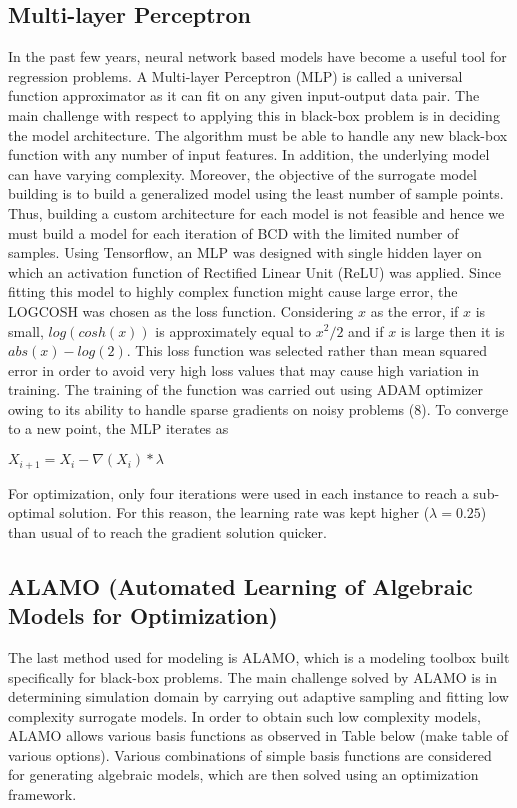 \subsection{Multi-layer Perceptron}
In the past few years, neural network based models have become a useful tool for regression problems. A Multi-layer Perceptron (MLP) is called a universal function approximator as it can fit on any given input-output data pair. The main challenge with respect to applying this in black-box problem is in deciding the model architecture. The algorithm must be able to handle any new black-box function with any number of input features. In addition, the underlying model can have varying complexity. Moreover, the objective of the surrogate model building is to build a generalized model using the least number of sample points. Thus, building a custom architecture for each model is not feasible and hence we must build a model for each iteration of BCD with the limited number of samples.
\bigskip
\noindent
Using Tensorflow, an MLP was designed with single hidden layer on which an activation function of Rectified Linear Unit (ReLU) was applied. Since fitting this model to highly complex function might cause large error, the LOGCOSH was chosen as the loss function. Considering $x$ as the error, if $x$ is small, $log(cosh(x))$ is approximately equal to $x^2 / 2$ and if $x$ is large then it is $abs(x) - log(2)$. This loss function was selected rather than mean squared error in order to avoid very high loss values that may cause high variation in training. The training of the function was carried out using ADAM optimizer owing to its ability to handle sparse gradients on noisy problems (8). To converge to a new point, the MLP iterates as 
\begin{center}
$X_{i+1} = X_i - \nabla (X_i)*\lambda$
\end{center}
For optimization, only four iterations were used in each instance to reach a sub-optimal solution. For this reason, the learning rate was kept higher ($\lambda = 0.25$) than usual of to reach the gradient solution quicker.

\subsection{ALAMO (Automated Learning of Algebraic Models for Optimization)}

The last method used for modeling is ALAMO, which is a modeling toolbox built specifically for black-box problems. The main challenge solved by ALAMO \cite{Lindqvist2018} is in determining simulation domain by carrying out adaptive sampling and fitting low complexity surrogate models.
In order to obtain such low complexity models, ALAMO allows various basis functions as observed in Table below (make table of various options).
Various combinations of simple basis functions are considered for generating algebraic models, which are then solved using an optimization framework. 

